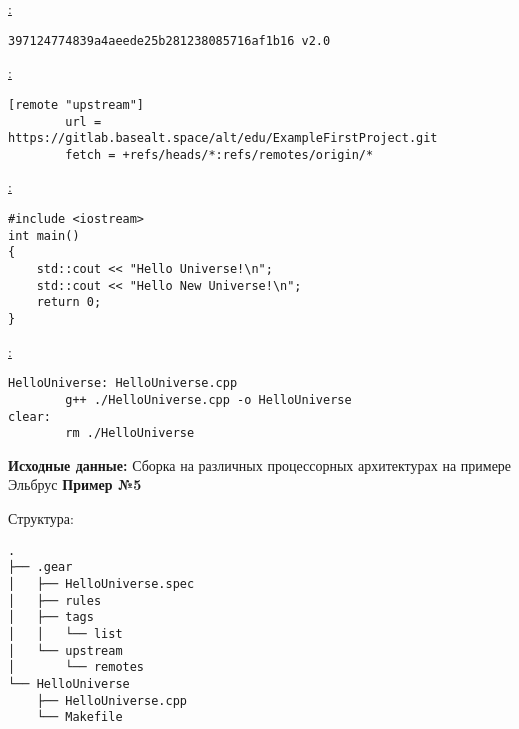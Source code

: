 \noindent\underline{:}
\begin{verbatim}
397124774839a4aeede25b281238085716af1b16 v2.0

\end{verbatim}

\noindent\underline{:}
\begin{verbatim}
[remote "upstream"]
        url = https://gitlab.basealt.space/alt/edu/ExampleFirstProject.git
        fetch = +refs/heads/*:refs/remotes/origin/*

\end{verbatim}

\noindent\underline{:}
\begin{verbatim}
#include <iostream>
int main()
{
    std::cout << "Hello Universe!\n";
    std::cout << "Hello New Universe!\n";
    return 0;
}

\end{verbatim}

\noindent\underline{:}
\begin{verbatim}
HelloUniverse: HelloUniverse.cpp
        g++ ./HelloUniverse.cpp -o HelloUniverse
clear:
        rm ./HelloUniverse
\end{verbatim}

\textbf{Исходные данные:} Сборка на различных процессорных архитектурах на примере Эльбрус \textbf{Пример №5}

\noindent Структура:
\begin{verbatim}
.
├── .gear
│   ├── HelloUniverse.spec
│   ├── rules
│   ├── tags
│   │   └── list
│   └── upstream
│       └── remotes
└── HelloUniverse
    ├── HelloUniverse.cpp
    └── Makefile

\end{verbatim}

